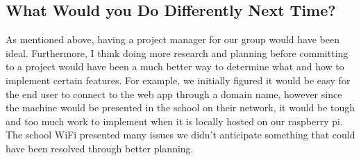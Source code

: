\documentclass{article}
\begin{document}
\subsection{What Would you Do Differently Next Time?}
As mentioned above, having a project manager for our group would have been ideal. Furthermore, I think doing more research and planning before committing to a project would have been a much better way to determine what and how to implement certain features. For example, we initially figured it would be easy for the end user to connect to the web app through a domain name, however since the machine would be presented in the school on their network, it would be tough and too much work to implement when it is locally hosted on our raspberry pi. The school WiFi presented many issues we didn't anticipate something that could have been resolved through better planning.
\end{document}
